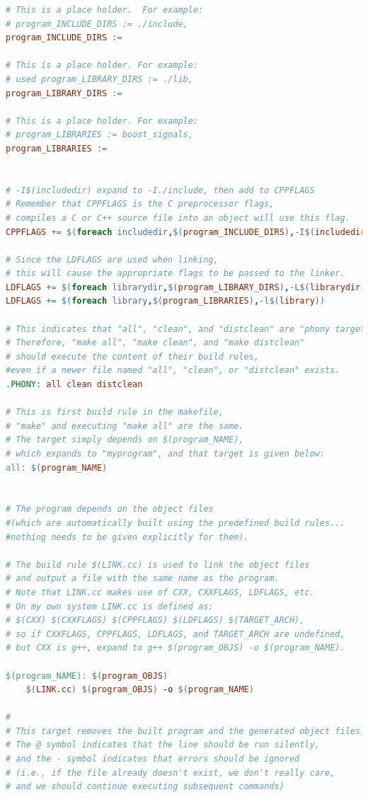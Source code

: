 \documentclass[a4paper,12pt,twoside]{book}
\begin{document}
\begin{itemize}
\begin{itemize}
\begin{lstlisting}[frame=single,  basicstyle=\small, language=make]
# This is a place holder.  For example:
# program_INCLUDE_DIRS := ./include, 
program_INCLUDE_DIRS :=

# This is a place holder. For example:
# used program_LIBRARY_DIRS := ./lib, 
program_LIBRARY_DIRS :=

# This is a place holder. For example:
# program_LIBRARIES := boost_signals, 
program_LIBRARIES :=


# -I$(includedir) expand to -I./include, then add to CPPFLAGS
# Remember that CPPFLAGS is the C preprocessor flags, 
# compiles a C or C++ source file into an object will use this flag.
CPPFLAGS += $(foreach includedir,$(program_INCLUDE_DIRS),-I$(includedir))

# Since the LDFLAGS are used when linking, 
# this will cause the appropriate flags to be passed to the linker.
LDFLAGS += $(foreach librarydir,$(program_LIBRARY_DIRS),-L$(librarydir))
LDFLAGS += $(foreach library,$(program_LIBRARIES),-l$(library))

# This indicates that "all", "clean", and "distclean" are "phony targets". 
# Therefore, "make all", "make clean", and "make distclean"
# should execute the content of their build rules, 
#even if a newer file named "all", "clean", or "distclean" exists.
.PHONY: all clean distclean

# This is first build rule in the makefile, 
# "make" and executing "make all" are the same.
# The target simply depends on $(program_NAME), 
# which expands to "myprogram", and that target is given below:
all: $(program_NAME)


# The program depends on the object files 
#(which are automatically built using the predefined build rules... 
#nothing needs to be given explicitly for them).

# The build rule $(LINK.cc) is used to link the object files
# and output a file with the same name as the program. 
# Note that LINK.cc makes use of CXX, CXXFLAGS, LDFLAGS, etc.
# On my own system LINK.cc is defined as: 
# $(CXX) $(CXXFLAGS) $(CPPFLAGS) $(LDFLAGS) $(TARGET_ARCH),
# so if CXXFLAGS, CPPFLAGS, LDFLAGS, and TARGET_ARCH are undefined,
# but CXX is g++, expand to g++ $(program_OBJS) -o $(program_NAME).

$(program_NAME): $(program_OBJS)
    $(LINK.cc) $(program_OBJS) -o $(program_NAME)

#
# This target removes the built program and the generated object files. 
# The @ symbol indicates that the line should be run silently, 
# and the - symbol indicates that errors should be ignored 
# (i.e., if the file already doesn't exist, we don't really care, 
# and we should continue executing subsequent commands)


\end{lstlisting}
\end{itemize}
\end{itemize}
\end{document}
